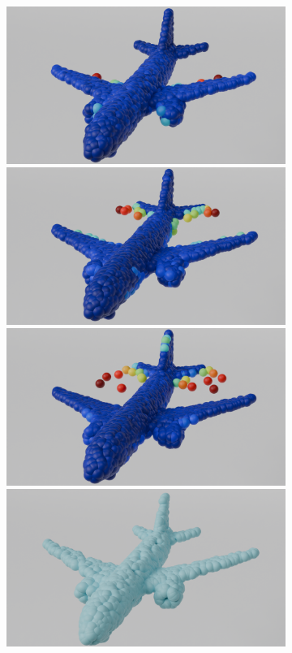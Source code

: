 \begin{figure}[htb]
\begin{subfigure}[t]{0.315\textwidth}
            \includegraphics[width=\textwidth]{figures/10z_ap_mcdo.png}
            \includegraphics[width=\textwidth]{figures/25z_ap_mcdo.png}
            \includegraphics[width=\textwidth]{figures/50z_ap_mcdo.png}
            \includegraphics[width=\textwidth]{figures/comp_ap.png}

\end{subfigure}
\end{figure}
